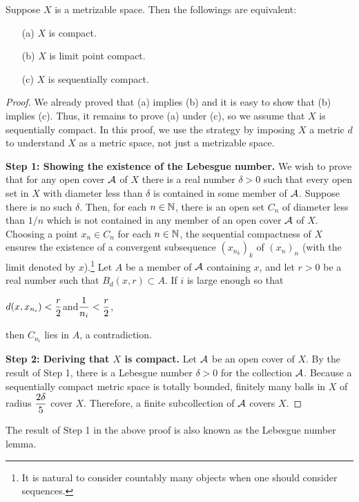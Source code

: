 \begin{thm}
    Suppose $X$ is a metrizable space.
    Then the followings are equivalent:
    \begin{enumerate}
        \item[(a)]
        {
            $X$ is compact.
        }
        \item[(b)]
        {
            $X$ is limit point compact.
        }
        \item[(c)]
        {
            $X$ is sequentially compact.
        }
    \end{enumerate}
\end{thm}
\begin{proof}
    We already proved that (a) implies (b) and it is easy to show that (b) implies (c).
    Thus, it remains to prove (a) under (c), so we assume that $X$ is sequentially compact.
    In this proof, we use the strategy by imposing $X$ a metric $d$ to understand $X$ as a metric space, not just a metrizable space.
    
    \textbf{Step 1: Showing the existence of the Lebesgue number.}\newline\noindent
    We wish to prove that for any open cover ${\mathcal{A}}$ of $X$ there is a real number $\delta>0$ such that every open set in $X$ with diameter less than $\delta$ is contained in some member of ${\mathcal{A}}$.
    Suppose there is no such $\delta$.
    Then, for each $n\in{\mathbb{N}}$, there is an open set $C_n$ of diameter less than $1/n$ which is not contained in any member of an open cover ${\mathcal{A}}$ of $X$.
    Choosing a point $x_n\in C_n$ for each $n\in{\mathbb{N}}$, the sequential compactness of $X$ ensures the existence of a convergent subsequence $(x_{n_k})_k$ of $(x_n)_n$ (with the limit denoted by $x$).\footnote{It is natural to consider countably many objects when one should consider sequences.}
    Let $A$ be a member of ${\mathcal{A}}$ containing $x$, and let $r>0$ be a real number such that $B_d(x, r)\subset A$.
    If $i$ is large enough so that
    \begin{center}
        $\displaystyle{d(x, x_{n_i})<\frac{r}{2}}$\quad and\quad$\displaystyle{\frac{1}{n_i}<\frac{r}{2}}$,
    \end{center}
    then $C_{n_i}$ lies in $A$, a contradiction.
    
    \textbf{Step 2: Deriving that $X$ is compact.}\newline\noindent
    Let ${\mathcal{A}}$ be an open cover of $X$.
    By the result of Step 1, there is a Lebesgue number $\delta>0$ for the collection ${\mathcal{A}}$.
    Because a sequentially compact metric space is totally bounded, finitely many balls in $X$ of radius $\displaystyle{\frac{2\delta}{5}}$ cover $X$.
    Therefore, a finite subcollection of ${\mathcal{A}}$ covers $X$. 
\end{proof}
\begin{rmk}
    The result of Step 1 in the above proof is also known as the Lebesgue number lemma.
\end{rmk}

